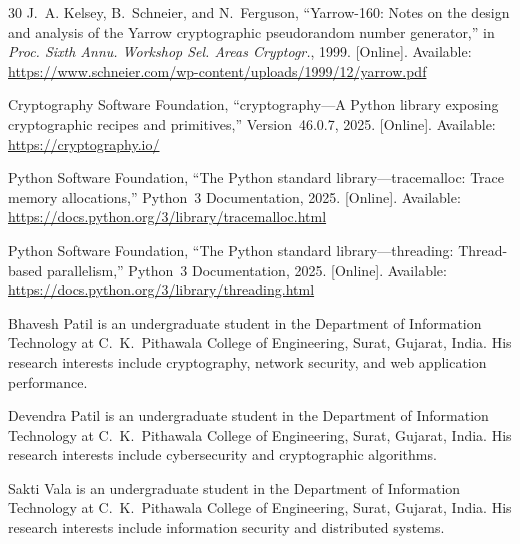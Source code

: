 \documentclass[journal]{IEEEtran}
\begin{document}
\begin{thebibliography}{30}
J.~A. Kelsey, B.~Schneier, and N.~Ferguson, ``Yarrow-160: Notes on the design and analysis of the Yarrow cryptographic pseudorandom number generator,'' in \textit{Proc. Sixth Annu. Workshop Sel. Areas Cryptogr.}, 1999. [Online]. Available: \url{https://www.schneier.com/wp-content/uploads/1999/12/yarrow.pdf}

Cryptography Software Foundation, ``cryptography---A Python library exposing cryptographic recipes and primitives,'' Version~46.0.7, 2025. [Online]. Available: \url{https://cryptography.io/}

Python Software Foundation, ``The Python standard library---tracemalloc: Trace memory allocations,'' Python~3 Documentation, 2025. [Online]. Available: \url{https://docs.python.org/3/library/tracemalloc.html}

Python Software Foundation, ``The Python standard library---threading: Thread-based parallelism,'' Python~3 Documentation, 2025. [Online]. Available: \url{https://docs.python.org/3/library/threading.html}

\end{thebibliography}


\begin{IEEEbiographynophoto}{Bhavesh Patil}
is an undergraduate student in the Department of Information Technology at C.~K.~Pithawala College of Engineering, Surat, Gujarat, India. His research interests include cryptography, network security, and web application performance.
\end{IEEEbiographynophoto}

\begin{IEEEbiographynophoto}{Devendra Patil}
is an undergraduate student in the Department of Information Technology at C.~K.~Pithawala College of Engineering, Surat, Gujarat, India. His research interests include cybersecurity and cryptographic algorithms.
\end{IEEEbiographynophoto}

\begin{IEEEbiographynophoto}{Sakti Vala}
is an undergraduate student in the Department of Information Technology at C.~K.~Pithawala College of Engineering, Surat, Gujarat, India. His research interests include information security and distributed systems.
\end{IEEEbiographynophoto}
\end{document}
